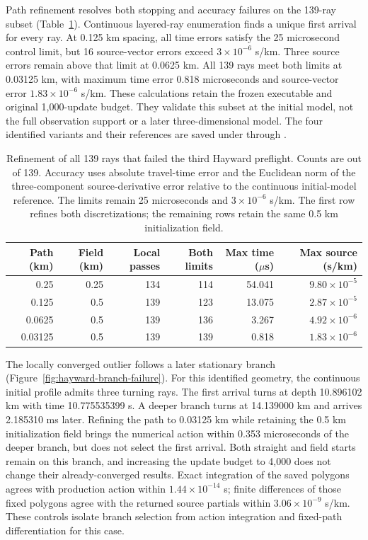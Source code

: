 Path refinement resolves both stopping and accuracy failures on the
139-ray subset (Table~\ref{tab:failed-ray-refinement}). Continuous layered-ray
enumeration finds a unique first arrival for every ray. At 0.125 km spacing,
all time errors satisfy the 25 microsecond control limit, but 16 source-vector
errors exceed $3\times10^{-6}$ s/km. Three source errors remain above that
limit at 0.0625 km. All 139 rays meet both limits at 0.03125 km, with maximum
time error 0.818 microseconds and source-vector error $1.83\times10^{-6}$
s/km. These calculations retain the frozen executable and original
1,000-update budget. They validate this subset at the initial model, not
the full observation support or a later three-dimensional model. The
four identified variants and their references are saved under
 through
.

\begin{table}[ht]
\centering
\small
\begin{tabular}{rrrrrr}
\toprule
Path (km) & Field (km) & Local passes & Both limits & Max time ($\mu$s) & Max source (s/km)\\
\midrule
0.25 & 0.25 & 134 & 114 & 54.041 & $9.80\times10^{-5}$\\
0.125 & 0.5 & 139 & 123 & 13.075 & $2.87\times10^{-5}$\\
0.0625 & 0.5 & 139 & 136 & 3.267 & $4.92\times10^{-6}$\\
0.03125 & 0.5 & 139 & 139 & 0.818 & $1.83\times10^{-6}$\\
\bottomrule
\end{tabular}
\caption{Refinement of all 139 rays that failed the third Hayward preflight.
Counts are out of 139. Accuracy uses absolute travel-time error and the
Euclidean norm of the three-component source-derivative error relative to
the continuous initial-model reference. The limits remain 25 microseconds
and $3\times10^{-6}$ s/km. The first row refines both discretizations;
the remaining rows retain the same 0.5 km initialization field.}
\label{tab:failed-ray-refinement}
\end{table}

The locally converged outlier follows a later stationary branch
(Figure~\ref{fig:hayward-branch-failure}). For this identified geometry, the
continuous initial profile admits three turning rays. The first arrival
turns at depth 10.896102 km with time 10.775535399 s. A deeper branch turns
at 14.139000 km and arrives 2.185310 ms later. Refining the path to
0.03125 km while retaining the 0.5 km initialization field brings the
numerical action within 0.353 microseconds of the deeper branch, but does
not select the first arrival. Both straight and field starts remain on this
branch, and increasing the update budget to 4,000 does not change their
already-converged results. Exact integration of the saved polygons agrees
with production action within $1.44\times10^{-14}$ s; finite differences
of those fixed polygons agree with the returned source partials within
$3.06\times10^{-9}$ s/km. These controls isolate branch selection from
action integration and fixed-path differentiation for this case.

